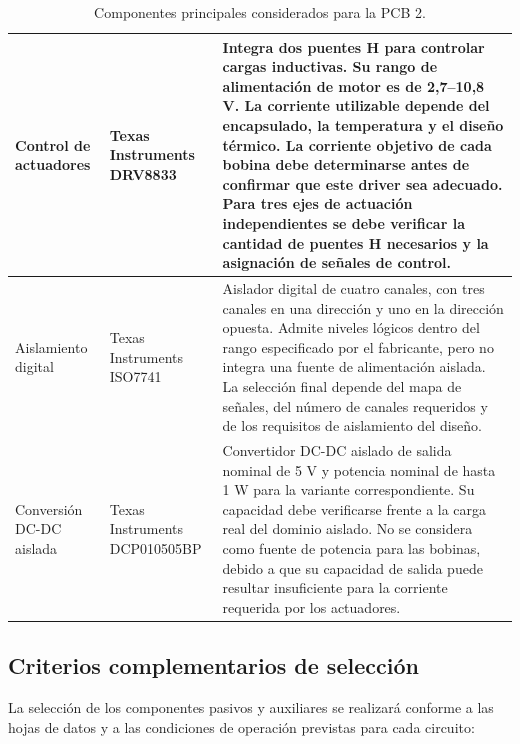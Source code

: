 \documentclass[11pt,a4paper]{article}
\begin{document}
\begin{table}[htbp]
\begin{tabularx}{\textwidth}{
|>{\raggedright\arraybackslash}p{2.6cm}
|>{\raggedright\arraybackslash}p{3.0cm}
|X|}
Control de actuadores &
Texas Instruments DRV8833 &
Integra dos puentes H para controlar cargas inductivas. Su rango de
alimentación de motor es de 2,7--10,8 V. La corriente utilizable depende
del encapsulado, la temperatura y el diseño térmico. La corriente
objetivo de cada bobina debe determinarse antes de confirmar que
este driver sea adecuado. Para tres ejes de actuación independientes
se debe verificar la cantidad de puentes H necesarios y la asignación
de señales de control. \\
\hline

Aislamiento digital &
Texas Instruments ISO7741 &
Aislador digital de cuatro canales, con tres canales en una dirección
y uno en la dirección opuesta. Admite niveles lógicos dentro del
rango especificado por el fabricante, pero no integra una fuente de
alimentación aislada. La selección final depende del mapa de señales,
del número de canales requeridos y de los requisitos de aislamiento
del diseño. \\
\hline

Conversión DC-DC aislada &
Texas Instruments DCP010505BP &
Convertidor DC-DC aislado de salida nominal de 5 V y potencia nominal
de hasta 1 W para la variante correspondiente. Su capacidad debe
verificarse frente a la carga real del dominio aislado. No se considera
como fuente de potencia para las bobinas, debido a que su capacidad
de salida puede resultar insuficiente para la corriente requerida por
los actuadores. \\
\hline
\end{tabularx}
\caption{Componentes principales considerados para la PCB 2.}
\label{tab:componentes_pcb2}
\end{table}

\subsection{Criterios complementarios de selección}

La selección de los componentes pasivos y auxiliares se realizará
conforme a las hojas de datos y a las condiciones de operación
previstas para cada circuito:
\end{document}
